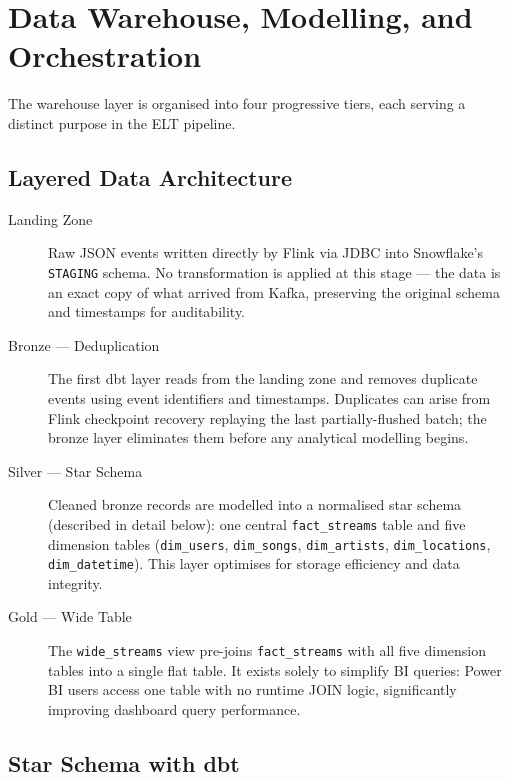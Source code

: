 \section{Data Warehouse, Modelling, and Orchestration}

The warehouse layer is organised into four progressive tiers, each serving a distinct purpose
in the ELT pipeline.

\subsection{Layered Data Architecture}

\begin{description}
  \item[Landing Zone] Raw JSON events written directly by Flink via JDBC into Snowflake's
    \texttt{STAGING} schema.
    No transformation is applied at this stage — the data is an exact copy of what arrived
    from Kafka, preserving the original schema and timestamps for auditability.

  \item[Bronze — Deduplication] The first dbt layer reads from the landing zone and removes
    duplicate events using event identifiers and timestamps.
    Duplicates can arise from Flink checkpoint recovery replaying the last partially-flushed
    batch; the bronze layer eliminates them before any analytical modelling begins.

  \item[Silver — Star Schema] Cleaned bronze records are modelled into a normalised
    star schema (described in detail below): one central \texttt{fact\_streams} table and five
    dimension tables (\texttt{dim\_users}, \texttt{dim\_songs}, \texttt{dim\_artists},
    \texttt{dim\_locations}, \texttt{dim\_datetime}).
    This layer optimises for storage efficiency and data integrity.

  \item[Gold — Wide Table] The \texttt{wide\_streams} view pre-joins \texttt{fact\_streams}
    with all five dimension tables into a single flat table.
    It exists solely to simplify BI queries: Power BI users access one table with no runtime
    JOIN logic, significantly improving dashboard query performance.
\end{description}

\subsection{Star Schema with dbt}

